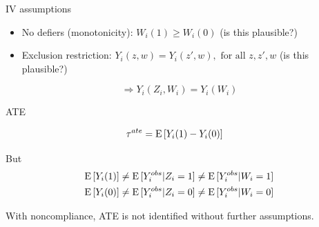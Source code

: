 \documentclass[xcolor={dvipsnames},handout]{beamer}
\begin{document}

\begin{frame}{IV assumptions}

\begin{itemize}
\item No defiers (monotonicity): $W_i(1)\ge W_i(0)$  (is this plausible?)
\item Exclusion restriction: $Y_i(z,w) = Y_i(z',w), \text{ for all } z, z',w $  (is this plausible?)
\end{itemize}


$$
\Rightarrow Y_i(Z_i,W_i) = Y_i(W_i)
$$

\end{frame}



\begin{frame}{ATE}

\begin{align*}
\tau^{ate} & = {\textrm E}\,[Y_i(1) - Y_i(0)]
\end{align*}

But
\begin{align*}
{\textrm E}\,[Y_i(1)] & \neq {\textrm E}\,[Y_i^{obs}|Z_i = 1]\neq {\textrm E}\,[Y_i^{obs}|W_i = 1]\\
{\textrm E}\,[Y_i(0)] & \neq {\textrm E}\,[Y_i^{obs}|Z_i = 0]\neq {\textrm E}\,[Y_i^{obs}|W_i = 0]\\
\end{align*}


With noncompliance, ATE is not identified without further assumptions.

\end{frame}


\end{document}
